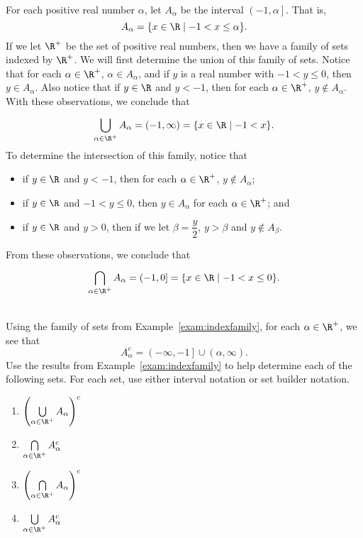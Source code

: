 \begin{example}\label{exam:indexfamily} \hfill \\
For each positive real number $\alpha$, let $A_\alpha$ be the interval 
$\left( -1, \alpha \right]$.  That is,
\[
A_\alpha = \left\{ x \in \R \mid -1 < x \leq \alpha \right\}\!.
\]
If we let $\R^+$ be the set of positive real numbers, then we have a family of sets indexed by $\R^+$.  We will first determine the union of this family of sets.  Notice that for each 
$\alpha \in \R^+$, $\alpha \in A_\alpha$, and if $y$ is a real number with $-1 < y \leq 0$, then $y \in A_\alpha$.  Also notice that if $y \in \R$ and $y < -1$, then for each $\alpha \in \R^+$, $y \notin A_\alpha$.  With these observations, we conclude that
\[
\bigcup_{\alpha \in \R^+}^{}A_\alpha = \left( -1, \infty \right) = 
\left\{ x \in \R \mid -1 < x \right\}\!.
\]
To determine the intersection of this family, notice that
\begin{itemize}
\item if $y \in \R$ and $y < -1$, then for each $\alpha \in \R^+$, $y \notin A_\alpha$;
\item if $y \in \R$ and $-1 < y \leq 0$, then $y \in A_\alpha$ for each $\alpha \in \R^+$; and
\item if $y \in \R$ and $y > 0$, then if we let $\beta = \dfrac{y}{2}$, $y > \beta$ and 
$y \notin A_\beta$.  
\end{itemize}
From these observations, we conclude that
\[
\bigcap_{\alpha \in \R^+}^{}A_\alpha = \left( -1, 0 \right] = 
\left\{ x \in \R \mid -1 < x \leq 0 \right\}\!.
\]
\end{example}
\hbreak


\begin{prog} \label{prog:indexfamily2} \hfill \\
Using the family of sets from Example~\ref{exam:indexfamily}, for each $\alpha \in \R^+$, we see that
\[
A_{\alpha}^c = \left(-\infty, -1 \right] \cup \left( \alpha, \infty \right)\!.
\]
Use the results from Example~\ref{exam:indexfamily} to help determine each of the following sets.  For each set, use either interval notation or set builder notation.
\begin{multicols}{2}
\begin{enumerate}
\item $\left( \bigcup\limits_{\alpha \in \R^+}^{}A_\alpha \right)^c$

\item $\bigcap\limits_{\alpha \in \R^+}^{}A_{\alpha}^c$

\item $\left( \bigcap\limits_{\alpha \in \R^+}^{}A_\alpha \right)^c$

\item $\bigcup\limits_{\alpha \in \R^+}^{}A_{\alpha}^c$
\end{enumerate}
\end{multicols}
\end{prog}


\endinput
